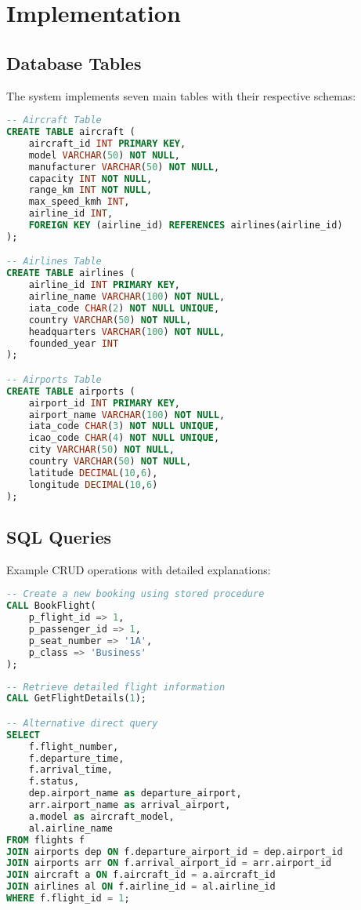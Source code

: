\documentclass[a4paper,12pt]{article}
\begin{document}
\section{Implementation}
\subsection{Database Tables}
The system implements seven main tables with their respective schemas:

\begin{lstlisting}[language=SQL, caption=Main Database Tables]
-- Aircraft Table
CREATE TABLE aircraft (
    aircraft_id INT PRIMARY KEY,
    model VARCHAR(50) NOT NULL,
    manufacturer VARCHAR(50) NOT NULL,
    capacity INT NOT NULL,
    range_km INT NOT NULL,
    max_speed_kmh INT,
    airline_id INT,
    FOREIGN KEY (airline_id) REFERENCES airlines(airline_id)
);

-- Airlines Table
CREATE TABLE airlines (
    airline_id INT PRIMARY KEY,
    airline_name VARCHAR(100) NOT NULL,
    iata_code CHAR(2) NOT NULL UNIQUE,
    country VARCHAR(50) NOT NULL,
    headquarters VARCHAR(100) NOT NULL,
    founded_year INT
);

-- Airports Table
CREATE TABLE airports (
    airport_id INT PRIMARY KEY,
    airport_name VARCHAR(100) NOT NULL,
    iata_code CHAR(3) NOT NULL UNIQUE,
    icao_code CHAR(4) NOT NULL UNIQUE,
    city VARCHAR(50) NOT NULL,
    country VARCHAR(50) NOT NULL,
    latitude DECIMAL(10,6),
    longitude DECIMAL(10,6)
);
\end{lstlisting}

\subsection{SQL Queries}
Example CRUD operations with detailed explanations:

\begin{lstlisting}[language=SQL, caption=Create Operation - Booking a Flight]
-- Create a new booking using stored procedure
CALL BookFlight(
    p_flight_id => 1,
    p_passenger_id => 1,
    p_seat_number => '1A',
    p_class => 'Business'
);
\end{lstlisting}

\begin{lstlisting}[language=SQL, caption=Read Operation - Get Flight Details]
-- Retrieve detailed flight information
CALL GetFlightDetails(1);

-- Alternative direct query
SELECT 
    f.flight_number,
    f.departure_time,
    f.arrival_time,
    f.status,
    dep.airport_name as departure_airport,
    arr.airport_name as arrival_airport,
    a.model as aircraft_model,
    al.airline_name
FROM flights f
JOIN airports dep ON f.departure_airport_id = dep.airport_id
JOIN airports arr ON f.arrival_airport_id = arr.airport_id
JOIN aircraft a ON f.aircraft_id = a.aircraft_id
JOIN airlines al ON f.airline_id = al.airline_id
WHERE f.flight_id = 1;
\end{lstlisting}
\end{document}
